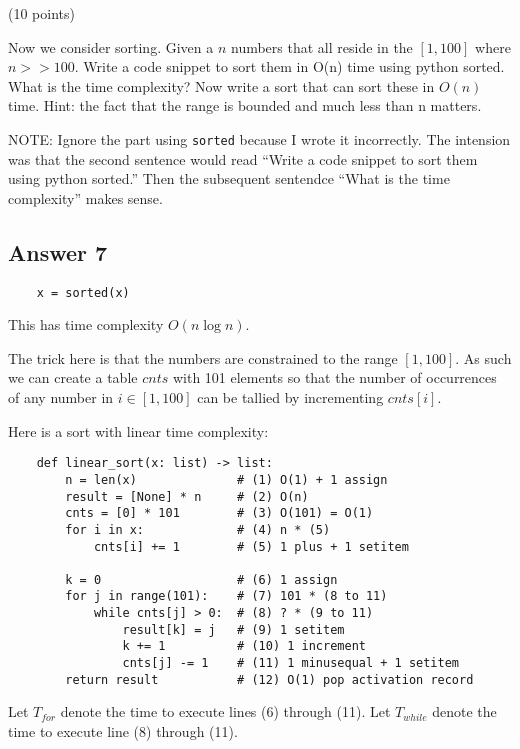\documentclass{article}
\begin{document}
(10 points)

Now we consider sorting. Given a $n$ numbers that all reside in the
$[1, 100]$ where $n >> 100$.  Write a code snippet to sort them in O(n)
time using python sorted. What is the time complexity? Now write a
sort that can sort these in $O(n)$ time. Hint: the fact that the range
is bounded and much less than n matters.

NOTE: Ignore the part using \verb|sorted| because I wrote it
incorrectly.  The intension was that the second sentence would read
``Write a code snippet to sort them using python sorted.''  Then the
subsequent sentendce ``What is the time complexity'' makes sense.


\subsection*{Answer 7}

\begin{verbatim}
    x = sorted(x)
\end{verbatim}

This has time complexity $O(n \log n)$.

The trick here is that the numbers are constrained to the range $[1,
  100]$.  As such we can create a table $cnts$ with 101 elements so
that the number of occurrences of any number in $i \in [1, 100]$ can
be tallied by incrementing $cnts[i]$.  


Here is a sort with linear time complexity:

\begin{verbatim}
    def linear_sort(x: list) -> list:
        n = len(x)              # (1) O(1) + 1 assign
        result = [None] * n     # (2) O(n)
        cnts = [0] * 101        # (3) O(101) = O(1)
        for i in x:             # (4) n * (5)
            cnts[i] += 1        # (5) 1 plus + 1 setitem
         
        k = 0                   # (6) 1 assign 
        for j in range(101):    # (7) 101 * (8 to 11)
            while cnts[j] > 0:  # (8) ? * (9 to 11)
                result[k] = j   # (9) 1 setitem
                k += 1          # (10) 1 increment
                cnts[j] -= 1    # (11) 1 minusequal + 1 setitem
        return result           # (12) O(1) pop activation record
\end{verbatim}

Let $T_{for}$ denote the time to execute lines (6) through (11).
Let $T_{while}$ denote the time to execute line (8) through (11).
\end{document}
